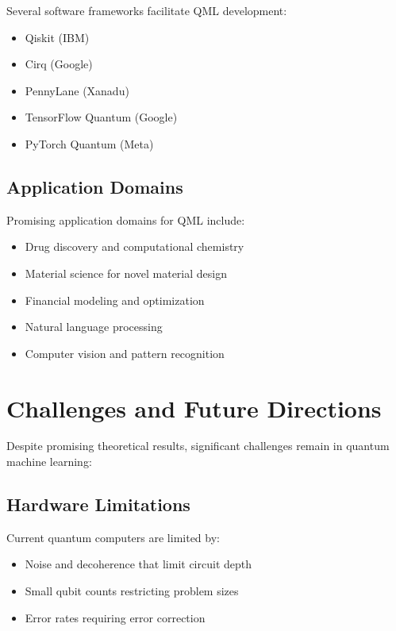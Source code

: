 \documentclass[12pt,a4paper]{article}
\begin{document}
Several software frameworks facilitate QML development:

\begin{itemize}
    \item Qiskit (IBM)
    \item Cirq (Google)
    \item PennyLane (Xanadu)
    \item TensorFlow Quantum (Google)
    \item PyTorch Quantum (Meta)
\end{itemize}

\subsection{Application Domains}

Promising application domains for QML include:

\begin{itemize}
    \item Drug discovery and computational chemistry
    \item Material science for novel material design
    \item Financial modeling and optimization
    \item Natural language processing
    \item Computer vision and pattern recognition
\end{itemize}

\section{Challenges and Future Directions}

Despite promising theoretical results, significant challenges remain in quantum machine learning:

\subsection{Hardware Limitations}

Current quantum computers are limited by:

\begin{itemize}
    \item Noise and decoherence that limit circuit depth
    \item Small qubit counts restricting problem sizes
    \item Error rates requiring error correction
\end{itemize}
\end{document}
